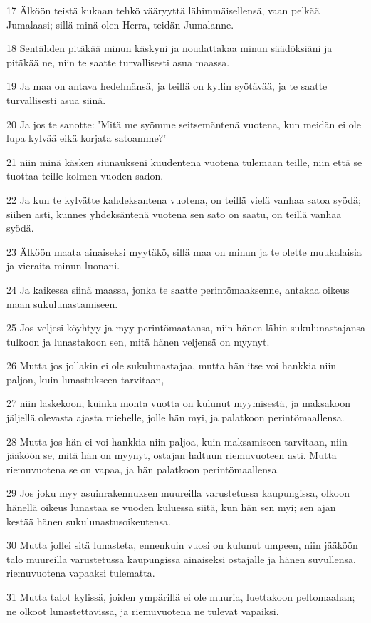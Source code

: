 \par 17 Älköön teistä kukaan tehkö vääryyttä lähimmäisellensä, vaan pelkää Jumalaasi; sillä minä olen Herra, teidän Jumalanne.
\par 18 Sentähden pitäkää minun käskyni ja noudattakaa minun säädöksiäni ja pitäkää ne, niin te saatte turvallisesti asua maassa.
\par 19 Ja maa on antava hedelmänsä, ja teillä on kyllin syötävää, ja te saatte turvallisesti asua siinä.
\par 20 Ja jos te sanotte: 'Mitä me syömme seitsemäntenä vuotena, kun meidän ei ole lupa kylvää eikä korjata satoamme?'
\par 21 niin minä käsken siunaukseni kuudentena vuotena tulemaan teille, niin että se tuottaa teille kolmen vuoden sadon.
\par 22 Ja kun te kylvätte kahdeksantena vuotena, on teillä vielä vanhaa satoa syödä; siihen asti, kunnes yhdeksäntenä vuotena sen sato on saatu, on teillä vanhaa syödä.
\par 23 Älköön maata ainaiseksi myytäkö, sillä maa on minun ja te olette muukalaisia ja vieraita minun luonani.
\par 24 Ja kaikessa siinä maassa, jonka te saatte perintömaaksenne, antakaa oikeus maan sukulunastamiseen.
\par 25 Jos veljesi köyhtyy ja myy perintömaatansa, niin hänen lähin sukulunastajansa tulkoon ja lunastakoon sen, mitä hänen veljensä on myynyt.
\par 26 Mutta jos jollakin ei ole sukulunastajaa, mutta hän itse voi hankkia niin paljon, kuin lunastukseen tarvitaan,
\par 27 niin laskekoon, kuinka monta vuotta on kulunut myymisestä, ja maksakoon jäljellä olevasta ajasta miehelle, jolle hän myi, ja palatkoon perintömaallensa.
\par 28 Mutta jos hän ei voi hankkia niin paljoa, kuin maksamiseen tarvitaan, niin jääköön se, mitä hän on myynyt, ostajan haltuun riemuvuoteen asti. Mutta riemuvuotena se on vapaa, ja hän palatkoon perintömaallensa.
\par 29 Jos joku myy asuinrakennuksen muureilla varustetussa kaupungissa, olkoon hänellä oikeus lunastaa se vuoden kuluessa siitä, kun hän sen myi; sen ajan kestää hänen sukulunastusoikeutensa.
\par 30 Mutta jollei sitä lunasteta, ennenkuin vuosi on kulunut umpeen, niin jääköön talo muureilla varustetussa kaupungissa ainaiseksi ostajalle ja hänen suvullensa, riemuvuotena vapaaksi tulematta.
\par 31 Mutta talot kylissä, joiden ympärillä ei ole muuria, luettakoon peltomaahan; ne olkoot lunastettavissa, ja riemuvuotena ne tulevat vapaiksi.
